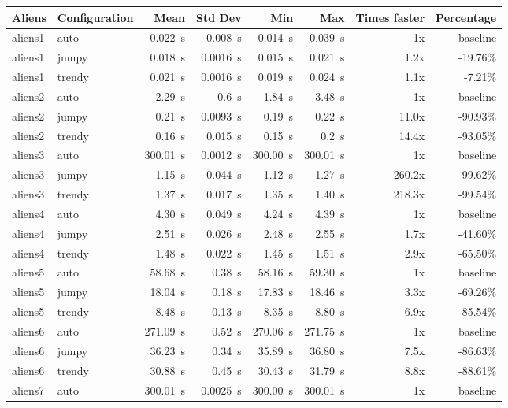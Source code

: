 \documentclass[11pt]{article}
\begin{document}
\begin{table}[h]
  \centering
  \begin{tabular}{|llrrrrrr|}
    \hline
    Aliens & Configuration & Mean & Std Dev & Min & Max & Times faster & Percentage \\
    \hline
    aliens1 & auto & 0.022~s & 0.008~s & 0.014~s & 0.039~s & 1x & baseline \\
    aliens1 & jumpy & 0.018~s & 0.0016~s & 0.015~s & 0.021~s & 1.2x & -19.76\% \\
    aliens1 & trendy & 0.021~s & 0.0016~s & 0.019~s & 0.024~s & 1.1x & -7.21\% \\
    \hline
    aliens2 & auto & 2.29~s & 0.6~s & 1.84~s & 3.48~s & 1x & baseline \\
    aliens2 & jumpy & 0.21~s & 0.0093~s & 0.19~s & 0.22~s & 11.0x & -90.93\% \\
    aliens2 & trendy & 0.16~s & 0.015~s & 0.15~s & 0.2~s & 14.4x & -93.05\% \\
    \hline
    aliens3 & auto & 300.01~s & 0.0012~s & 300.00~s & 300.01~s & 1x & baseline \\
    aliens3 & jumpy & 1.15~s & 0.044~s & 1.12~s & 1.27~s & 260.2x & -99.62\% \\
    aliens3 & trendy & 1.37~s & 0.017~s & 1.35~s & 1.40~s & 218.3x & -99.54\% \\
    \hline
    aliens4 & auto & 4.30~s & 0.049~s & 4.24~s & 4.39~s & 1x & baseline \\
    aliens4 & jumpy & 2.51~s & 0.026~s & 2.48~s & 2.55~s & 1.7x & -41.60\% \\
    aliens4 & trendy & 1.48~s & 0.022~s & 1.45~s & 1.51~s & 2.9x & -65.50\% \\
    \hline
    aliens5 & auto & 58.68~s & 0.38~s & 58.16~s & 59.30~s & 1x & baseline \\
    aliens5 & jumpy & 18.04~s & 0.18~s & 17.83~s & 18.46~s & 3.3x & -69.26\% \\
    aliens5 & trendy & 8.48~s & 0.13~s & 8.35~s & 8.80~s & 6.9x & -85.54\% \\
    \hline
    aliens6 & auto & 271.09~s & 0.52~s & 270.06~s & 271.75~s & 1x & baseline \\
    aliens6 & jumpy & 36.23~s & 0.34~s & 35.89~s & 36.80~s & 7.5x & -86.63\% \\
    aliens6 & trendy & 30.88~s & 0.45~s & 30.43~s & 31.79~s & 8.8x & -88.61\% \\
    \hline
    aliens7 & auto & 300.01~s & 0.0025~s & 300.00~s & 300.01~s & 1x & baseline \\

\end{tabular}
\end{table}
\end{document}
